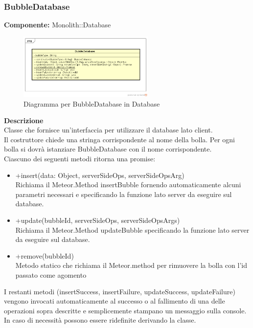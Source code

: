 \subsubsection{BubbleDatabase}
\textbf{Componente:}  Monolith::Database\\
   \FloatBarrier
   \begin{figure}[ht]
   \centering
   \includegraphics[width=0.6\textwidth]{img/single-BubbleDatabase.png}
   \caption{{Diagramma per BubbleDatabase in Database}}
\end{figure}
\FloatBarrier
\textbf{Descrizione}\\
Classe che fornisce un'interfaccia per utilizzare il database lato client. 
\\
Il costruttore chiede una stringa corrispondente al nome della bolla. Per ogni bolla si dovrà istanziare BubbleDatabase con il nome corrispondente.
\\
Ciascuno dei seguenti metodi ritorna una promise:
\begin{itemize} 
\item +insert(data: Object, serverSideOps, serverSideOpsArg) \\
Richiama il Meteor.Method insertBubble fornendo automaticamente alcuni parametri necessari e specificando la funzione lato server da eseguire sul database. 
\item +update(bubbleId, serverSideOps, serverSideOpsArgs) \\
Richiama il Meteor.Method updateBubble specificando la funzione lato server da eseguire sul database.
\item +remove(bubbleId) \\
Metodo statico che richiama il Meteor.method per rimuovere la bolla con l'id passato come agomento
\end{itemize}
I restanti metodi (insertSuccess, insertFailure, updateSuccess, updateFailure) vengono invocati automaticamente al successo o al fallimento di una delle operazioni sopra descritte e semplicemente stampano un messaggio sulla console. In caso di necessità possono essere ridefinite derivando la classe. 


